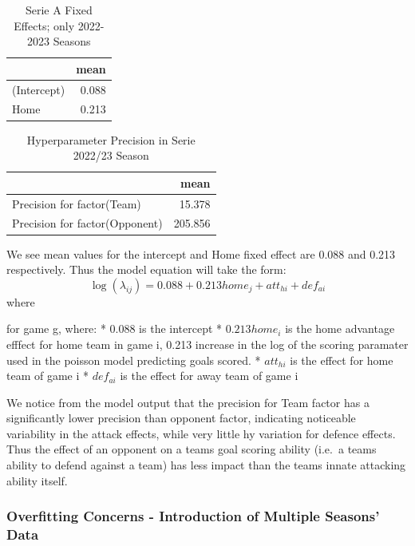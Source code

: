 \documentclass[
]{article}
\begin{document}
\begin{table}

\caption{\label{tab:unnamed-chunk-3}Serie A Fixed Effects; only 2022-2023 Seasons}
\centering
\begin{tabular}[t]{l|r}
\hline
  & mean\\
\hline
(Intercept) & 0.088\\
\hline
Home & 0.213\\
\hline
\end{tabular}
\end{table}

\begin{table}

\caption{\label{tab:unnamed-chunk-3}Hyperparameter Precision in Serie 2022/23 Season}
\centering
\begin{tabular}[t]{l|r}
\hline
  & mean\\
\hline
Precision for factor(Team) & 15.378\\
\hline
Precision for factor(Opponent) & 205.856\\
\hline
\end{tabular}
\end{table}

We see mean values for the intercept and Home fixed effect are 0.088 and
0.213 respectively. Thus the model equation will take the form:
\[\log(\lambda_{ij}) = 0.088 + 0.213{home}_j + {att}_{hi} + {def}_{ai} \]
where

for game g, where: * 0.088 is the intercept * \(0.213home_i\) is the
home advantage efffect for home team in game i, 0.213 increase in the
log of the scoring paramater used in the poisson model predicting goals
scored. * \({att}_{hi}\) is the effect for home team of game i *
\({def}_{ai}\) is the effect for away team of game i

We notice from the model output that the precision for Team factor has a
significantly lower precision than opponent factor, indicating
noticeable variability in the attack effects, while very little hy
variation for defence effects. Thus the effect of an opponent on a teams
goal scoring ability (i.e.~a teams ability to defend against a team) has
less impact than the teams innate attacking ability itself.

\hypertarget{overfitting-concerns---introduction-of-multiple-seasons-data}{%
\subsubsection{Overfitting Concerns - Introduction of Multiple Seasons'
Data}\label{overfitting-concerns---introduction-of-multiple-seasons-data}}
\end{document}
